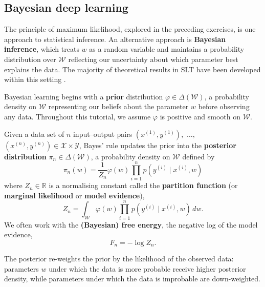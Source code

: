 \documentclass[11pt]{article}
\newcommand{\R}{\mathbb{R}}
\newcommand{\X}{\mathcal{X}}
\newcommand{\Y}{\mathcal{Y}}
\newcommand{\W}{\mathcal{W}}
\begin{document}
\subsection{Bayesian deep learning}
\label{sec:bayesian-dl}

The principle of maximum likelihood, explored in the preceding exercises,
is one approach to statistical inference. An alternative approach is
\textbf{Bayesian inference}, which treats $w$ as a random variable and
maintains a probability distribution over $\W$ reflecting our uncertainty about
which parameter best explains the data. The majority of theoretical results
in SLT have been developed within this setting
    \citep[cf.,]{Watanabe2009,Watanabe2018}.

Bayesian learning begins with a \textbf{prior} distribution
    $\varphi \in \Delta(\W)$,
a probability density on $\W$ representing our beliefs about the parameter
$w$ before observing any data. Throughout this tutorial, we assume $\varphi$ is
positive and smooth on $\W$.

\begin{definition}
\label{def:posterior}
\label{def:partition-function}
\label{def:free-energy}
    Given a data set of $n$ input--output pairs
        $(x^{(1)}, y^{(1)}),$ $\ldots,$ $(x^{(n)}, y^{(n)}) \in \X \times \Y$,
    Bayes' rule updates the prior into the \textbf{posterior distribution}
        $\pi_n \in \Delta(\W)$, a probability density on $\W$ defined by
    \begin{equation}
    \label{eq:posterior}
        \pi_n(w)
        = \frac{1}{Z_n} \varphi(w) \prod_{i=1}^{n} p(y^{(i)} \mid x^{(i)}, w)
    \end{equation}
    where $Z_n \in \R$ is a normalising constant called the \textbf{partition
    function} (or \textbf{marginal likelihood} or \textbf{model evidence}),
    \begin{equation}
    \label{eq:partition-function}
        Z_n
        = \int_{\W} \varphi(w) \prod_{i=1}^{n} p(y^{(i)} \mid x^{(i)}, w)\, dw.
    \end{equation}
    We often work with the \textbf{(Bayesian) free energy}, the negative log
    of the model evidence,
    \begin{equation}
    \label{eq:free-energy}
        F_n
        = -\log Z_n.
    \end{equation}
\end{definition}

The posterior re-weights the prior by the likelihood of the observed data:
parameters $w$ under which the data is more probable receive higher posterior
density, while parameters under which the data is improbable are
down-weighted. 
\end{document}
